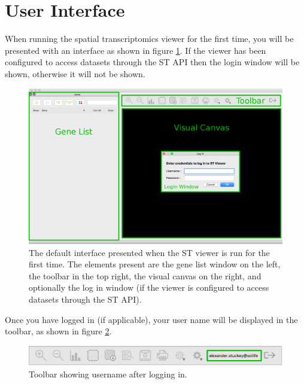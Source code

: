 \documentclass[10pt,a4paper,titlepage]{book}
\begin{document}
\section{User Interface}
 When running the spatial transcriptomics viewer for the first time, you will be presented with an interface as shown in figure \ref{fig:default_view}. If the viewer has been configured to access datasets through the ST API then the login window will be shown, otherwise it will not be shown.
\begin{figure}[h]
	\centering
	\includegraphics[width=0.8\linewidth]{./Pictures/default_logged_out_labelled}
	\caption[The spatial transcriptomics viewer default interface]{The default interface presented when the ST viewer is run for the first time. The elements present are the gene list window on the left, the toolbar in the top right, the visual canvas on the right, and optionally the log in window (if the viewer is configured to access datasets through the ST API).}
	\label{fig:default_view}

\end{figure}

Once you have logged in (if applicable), your user name will be displayed in the toolbar, as shown in figure \ref{fig:user_name}.
\begin{figure}[h]
	\centering
	\includegraphics[width=0.8\linewidth]{./Pictures/logged_in}
	\caption{Toolbar showing username after logging in.}
	\label{fig:user_name}
\end{figure}
\end{document}

